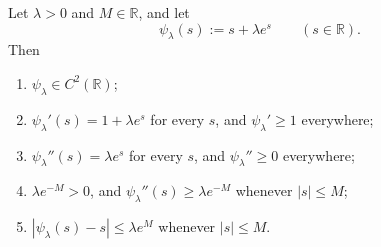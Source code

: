 \begin{lemma}
Let $\lambda>0$ and $M\in\mathbb R$, and let
\[
 \psi_\lambda(s):=s+\lambda e^{s}\qquad(s\in\mathbb R).
\]
Then
\begin{enumerate}
\item $\psi_\lambda\in C^{2}(\mathbb R)$;
\item $\psi_\lambda'(s)=1+\lambda e^{s}$ for every $s$, and $\psi_\lambda'\ge1$ everywhere;
\item $\psi_\lambda''(s)=\lambda e^{s}$ for every $s$, and $\psi_\lambda''\ge0$ everywhere;
\item $\lambda e^{-M}>0$, and $\psi_\lambda''(s)\ge\lambda e^{-M}$ whenever $|s|\le M$;
\item $|\psi_\lambda(s)-s|\le\lambda e^{M}$ whenever $|s|\le M$.
\end{enumerate}
\end{lemma}
